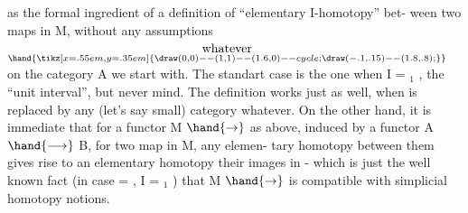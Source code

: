 
as the formal ingredient of a definition of ``elementary I-homotopy'' bet-%
ween two maps in M, without any assumptions \(\underset{\hand{\tikz[x=.55em,y=.35em]{\draw (0,0)--(1,1)--(1.6,0)--cycle; \draw (-.1,.15)--(1.8,.8);}}}{\text{whatever}}\) on  the category
A we start with. The standart case is the one when I = \hand{$\Delta$}$_1$ , the ``unit
interval'', but never mind. The definition works just as well, when \hand{$\Delta$}
is replaced by any (let's say small) category \hand{$\Delta$} whatever. On the other
hand, it is immediate that for a functor M $\hand{\to}$  as above, induced by
a functor A $\hand{\longrightarrow}$ B,  for two map in M, any elemen-%
tary homotopy between them gives rise to an elementary homotopy  their
images in  - which  is just the well known fact (in case \hand{$\Delta$}=\hand{$\Delta$} ,
I = \hand{$\Delta$}$_1$ ) that M $\hand{\to}$  is compatible with simplicial homotopy notions.

